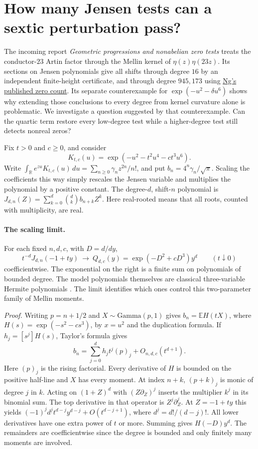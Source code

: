 \section{How many Jensen tests can a sextic perturbation pass?}
\label{sec:kernel}
The incoming report \emph{Geometric progressions and nonabelian zero
tests} treats the conductor-$23$ Artin factor through the Mellin kernel of
$\eta(z)\eta(23z)$. Its sections on Jensen polynomials give all shifts
through degree $16$ by an independent finite-height certificate, and
through degree $945{,}173$ using \href{https://www.cs.uleth.ca/~nathanng/RESEARCH/phd.thesis.pdf}{Ng's published zero count}. Its separate
counterexample for $\exp(-u^2-\delta u^6)$ shows why extending those
conclusions to every degree from kernel curvature alone is problematic.
We investigate a question suggested by that counterexample. Can the
quartic term restore every low-degree test while a higher-degree test
still detects nonreal zeros?

Fix $t>0$ and $c\ge0$, and consider
\[
 K_{t,c}(u)=\exp(-u^2-t^2u^4-ct^3u^6).
\]
Write $\int_{\mathbb R}e^{zu}K_{t,c}(u)\,du
=\sum_{n\ge0}\gamma_n z^{2n}/n!$, and put
$b_n=4^n\gamma_n/\sqrt\pi$.
Scaling the coefficients this way simply rescales the Jensen variable
and multiplies the polynomial by a positive constant.
The degree-$d$, shift-$n$ polynomial is
$J_{d,n}(Z)=\sum_{k=0}^d\binom dk b_{n+k}Z^k$.
Here real-rooted means that all roots, counted with multiplicity, are real.

\paragraph{The scaling limit.}
For each fixed $n,d,c$, with $D=d/dy$,
\[
 t^{-d}J_{d,n}(-1+ty)\ \longrightarrow\ Q_{d,c}(y)
 =\exp(-D^2+cD^3)y^d
 \qquad(t\downarrow0)
\]
coefficientwise. The exponential on the right is a finite sum on
polynomials of bounded degree. The model polynomials themselves are
classical three-variable Hermite polynomials \cite{hermite}. The limit identifies
which ones control this two-parameter family of Mellin moments.

\emph{Proof.}
Writing $p=n+1/2$ and $X\sim\mathrm{Gamma}(p,1)$ gives
$b_n=\mathbb E H(tX)$, where $H(s)=\exp(-s^2-cs^3)$, by $x=u^2$
and the duplication formula. If $h_j=[s^j]H(s)$, Taylor's formula gives
\[
 b_n=\sum_{j=0}^d h_j t^j (p)_j+O_{n,d,c}(t^{d+1}).
\]
Here $(p)_j$ is the rising factorial. Every derivative of $H$ is bounded
on the positive half-line and $X$ has every moment. At index $n+k$,
$(p+k)_j$ is monic of degree $j$ in $k$. Acting on $(1+Z)^d$ with
$(Z\partial_Z)^j$ inserts the multiplier $k^j$ in its binomial sum.
The top derivative in that operator is $Z^j\partial_Z^j$. At $Z=-1+ty$
this yields $(-1)^j d^{\underline j}t^{d-j}y^{d-j}+O(t^{d-j+1})$,
where $d^{\underline j}=d!/(d-j)!$.
All lower derivatives have one extra power of $t$ or more.
Summing gives $H(-D)y^d$. The remainders are coefficientwise since
the degree is bounded and only finitely many moments are involved.

